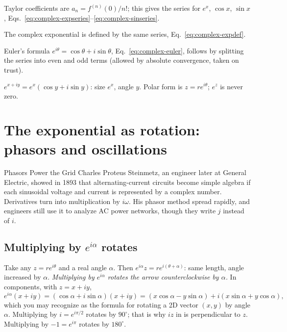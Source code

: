 \begin{keyideas}
\item Taylor coefficients are $a_n=f^{(n)}(0)/n!$; this gives the series for $e^x$, $\cos x$, $\sin x$, Eqs.~\eqref{eq:complex-expseries}--\eqref{eq:complex-sinseries}.
\item The complex exponential is defined by the same series, Eq.~\eqref{eq:complex-expdef}.
\item Euler's formula $e^{i\theta}=\cos\theta+i\sin\theta$, Eq.~\eqref{eq:complex-euler}, follows by splitting the series into even and odd terms (allowed by absolute convergence, taken on trust).
\item $e^{x+iy}=e^x(\cos y+i\sin y)$: size $e^x$, angle $y$. Polar form is $z=re^{i\theta}$; $e^z$ is never zero.
\end{keyideas}

\section{The exponential as rotation: phasors and oscillations}\label{sec:complex-rotation}
\begin{didyouknow}{Phasors Power the Grid}
Charles Proteus Steinmetz, an engineer later at General Electric, showed in 1893 that alternating-current circuits become simple algebra if each sinusoidal voltage and current is represented by a complex number. Derivatives turn into multiplication by $i\omega$. His phasor method spread rapidly, and engineers still use it to analyze AC power networks, though they write $j$ instead of $i$.
\end{didyouknow}

\subsection{Multiplying by $e^{i\alpha}$ rotates}

Take any $z=re^{i\theta}$ and a real angle $\alpha$. Then $e^{i\alpha}z=re^{i(\theta+\alpha)}$: same length, angle increased by $\alpha$. \emph{Multiplying by $e^{i\alpha}$ rotates the arrow counterclockwise by $\alpha$.} In components, with $z=x+iy$,
\begin{equation}
e^{i\alpha}(x+iy)=(\cos\alpha+i\sin\alpha)(x+iy)=(x\cos\alpha-y\sin\alpha)+i(x\sin\alpha+y\cos\alpha),\label{eq:complex-rotation}
\end{equation}
which you may recognize as the formula for rotating a 2D vector $(x,y)$ by angle $\alpha$. Multiplying by $i=e^{i\pi/2}$ rotates by $90^\circ$; that is why $iz$ in  is perpendicular to $z$. Multiplying by $-1=e^{i\pi}$ rotates by $180^\circ$.

